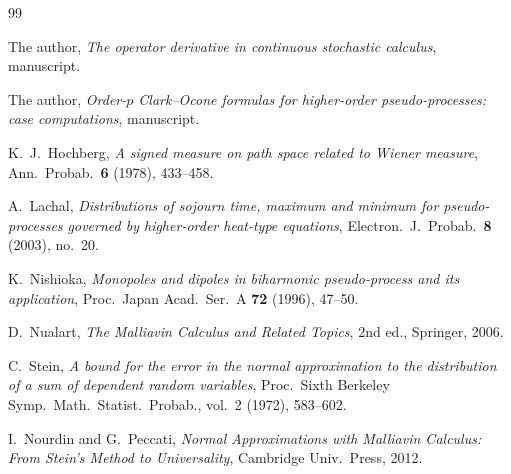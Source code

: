 \documentclass[11pt,reqno]{amsart}
\theoremstyle{plain}
\theoremstyle{definition}
\begin{document}
\begin{thebibliography}{99}

The author, \emph{The operator derivative in continuous stochastic calculus}, manuscript.

The author, \emph{Order-$p$ Clark--Ocone formulas for higher-order pseudo-processes: case computations}, manuscript.

K.~J.~Hochberg, \emph{A signed measure on path space related to Wiener measure}, Ann.~Probab.\ \textbf{6} (1978), 433--458.

A.~Lachal, \emph{Distributions of sojourn time, maximum and minimum for pseudo-processes governed by higher-order heat-type equations}, Electron.~J.~Probab.\ \textbf{8} (2003), no.~20.

K.~Nishioka, \emph{Monopoles and dipoles in biharmonic pseudo-process and its application}, Proc.~Japan Acad.~Ser.~A \textbf{72} (1996), 47--50.

D.~Nualart, \emph{The Malliavin Calculus and Related Topics}, 2nd ed., Springer, 2006.

C.~Stein, \emph{A bound for the error in the normal approximation to the distribution of a sum of dependent random variables}, Proc.\ Sixth Berkeley Symp.\ Math.\ Statist.\ Probab., vol.~2 (1972), 583--602.

I.~Nourdin and G.~Peccati, \emph{Normal Approximations with Malliavin Calculus: From Stein's Method to Universality}, Cambridge Univ.\ Press, 2012.

\end{thebibliography}
\end{document}
